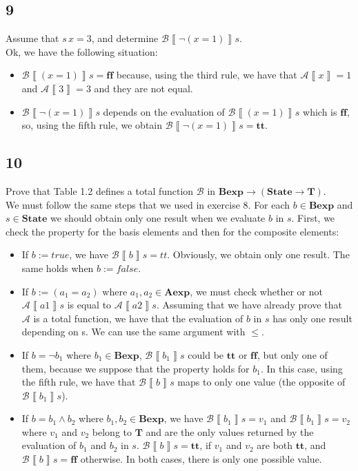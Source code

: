 \documentclass[spanish, a4paper, 12pt] {article}
\newcommand{\aexp}[0]{\textbf{Aexp}}
\newcommand{\bexp}[0]{\textbf{Bexp}}
\newcommand{\ff}[0]{\textbf{ff}}
\newcommand{\state}[0]{\textbf{State}}
\newcommand{\T}[0]{\textbf{T}}
\newcommand{\Tt}[0]{\textbf{tt}}
\newcommand{\A}[0]{\mathcal{A}}
\newcommand{\B}[0]{\mathcal{B}}
\newcommand{\eval}[1]{\left\llbracket #1 \right\rrbracket}
\renewcommand{\=}[0]{:=}
\renewcommand{\;}[0]{\mbox{; }}
\begin{document}
\subsection{9}
Assume that $s\,x = 3$, and determine $\B\eval{\neg(x = 1)}s$.\\

Ok, we have the following situation:
\begin{itemize}
    \item $\B\eval{(x = 1)}s = \ff$ because, using the third rule, we have that $\A\eval{x} = 1$ and $\A\eval{3} = 3$ and they are not equal.
    \item $\B\eval{\neg(x = 1)}s$ depends on the evaluation of $\B\eval{(x = 1)}s$ which is $\ff$, so, using the fifth rule, we obtain $\B\eval{\neg(x = 1)}s = \Tt$.
\end{itemize}
\subsection{10}
Prove that Table 1.2 defines a total function $\B$ in $\bexp \rightarrow (\state \rightarrow \T)$.\\

We must follow the same steps that we used in exercise 8. For each $b \in \bexp$ and $s \in \state$ we should obtain only one result when we evaluate $b$ in $s$. First, we check the property for the basis elements and then for the composite elements:
\begin{itemize}
    \item If $b := true$, we have $\B\eval{b}s = tt$. Obviously, we obtain only one result. The same holds when $b := false$.
    \item If $b := (a_1 = a_2)$ where $a_1, a_2 \in \aexp$, we must check whether or not $\A\eval{a1}s$ is equal to $\A\eval{a2}s$. Assuming that we have already prove that $\A$ is a total function, we have that the evaluation of $b$ in $s$ has only one result depending on s. We can use the same argument with $\le$.
    \item If $b = \neg b_1$ where $b_1 \in \bexp$, $\B\eval{b_1}s$ could be $\Tt$ or $\ff$, but only one of them, because we suppose that the property holds for $b_1$. In this case, using the fifth rule, we have that $\B\eval{b}s$ maps to only one value (the opposite of $\B\eval{b_1}s$).
    \item If $b = b_1 \wedge b_2$ where $b_1, b_2 \in \bexp$, we have $\B\eval{b_1}s = v_1$ and $\B\eval{b_1}s = v_2$ where $v_1$ and $v_2$ belong to $\T$ and are the only values returned by the evaluation of $b_1$ and $b_2$ in $s$. $\B\eval{b}s = \Tt$, if $v_1$ and $v_2$ are both $\Tt$, and $\B\eval{b}s = \ff$ otherwise. In both cases, there is only one possible value.
\end{itemize}
\end{document}
